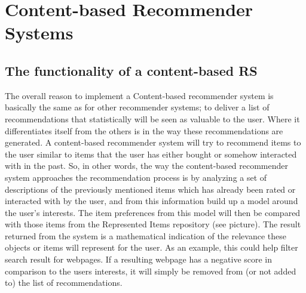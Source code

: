 \section{Content-based Recommender Systems}

\subsection{The functionality of a content-based RS}
The overall reason to implement a Content-based recommender system is basically the same as for other recommender systems; to deliver a list of recommendations that statistically will be seen as valuable to the user. Where it differentiates itself from the others is in the way these recommendations are generated. A content-based recommender system will try to recommend items to the user similar to items that the user has either bought or somehow interacted with in the past. So, in other words, the way the content-based recommender system approaches the recommendation process is by analyzing a set of descriptions of the previously mentioned items which has already been rated or interacted with by the user, and from this information build up a model around the user’s interests. The item preferences from this model will then be compared with those items from the Represented Items repository (see picture). The result returned from the system is a mathematical indication of the relevance these objects or items will represent for the user. As an example, this could help filter search result for webpages. If a resulting webpage has a negative score in comparison to the users interests, it will simply be removed from (or not added to) the list of recommendations.

